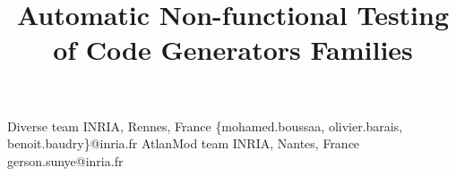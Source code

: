 \documentclass[preprint,10pt]{sigplanconf}
\begin{document}
 

\title{Automatic Non-functional Testing of Code Generators Families}
 

           {Diverse team INRIA, Rennes, France}
           { \{mohamed.boussaa, olivier.barais, benoit.baudry\}@inria.fr}
           {AtlanMod team INRIA, Nantes, France}
           {gerson.sunye@inria.fr}


\maketitle

\newcommand{\etal}{et al.}
\newcommand{\eg}[0]{e.\,g.}
\newcommand{\ie}[0]{i.\,e.}







%






 

 
 








 

 
\end{document}
